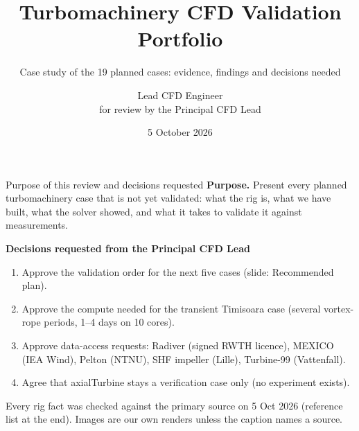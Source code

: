 \documentclass[aspectratio=169,10pt]{beamer}
\title{Turbomachinery CFD Validation Portfolio}
\subtitle{Case study of the 19 planned cases: evidence, findings and decisions needed}
\author{Lead CFD Engineer \\ \small for review by the Principal CFD Lead}
\date{5 October 2026}
\begin{document}
\begin{frame}\titlepage\end{frame}


\begin{frame}{Purpose of this review and decisions requested}
\small
\textbf{Purpose.} Present every planned turbomachinery case that is not yet validated: what the rig is, what we have built, what the solver showed, and what it takes to validate it against measurements.
\vspace{2mm}

\textbf{Decisions requested from the Principal CFD Lead}
\begin{enumerate}
\item Approve the validation order for the next five cases (slide: Recommended plan).
\item Approve the compute needed for the transient Timisoara case (several vortex-rope periods, 1--4 days on 10 cores).
\item Approve data-access requests: Radiver (signed RWTH licence), MEXICO (IEA Wind), Pelton (NTNU), SHF impeller (Lille), Turbine-99 (Vattenfall).
\item Agree that axialTurbine stays a verification case only (no experiment exists).
\end{enumerate}
\vspace{1mm}
\footnotesize Every rig fact was checked against the primary source on 5 Oct 2026 (reference list at the end). Images are our own renders unless the caption names a source.
\end{frame}
\end{document}
